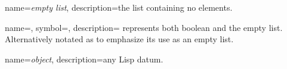 {
  name={\sl empty list},
  description={the list containing no elements.}
}


{
  name={},
  symbol={\lsp{()}},
  description={%
    represents both boolean  and the \gls{empty list}.
    Alternatively notated as 
    to emphasize its use as an \gls{empty list}.
  }
}


{
  name={\sl object},
  description={any Lisp datum.}
}
